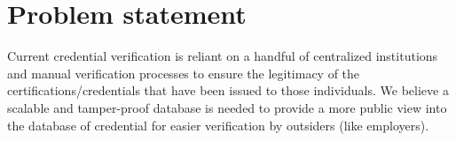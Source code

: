 \section{Problem statement}

Current credential verification is reliant on a handful of centralized institutions and manual
verification processes to ensure the legitimacy of the certifications/credentials that have been
issued to those individuals. 
We believe a scalable and tamper-proof database is needed to provide a more public view into the
database of credential for easier verification by outsiders (like employers).

